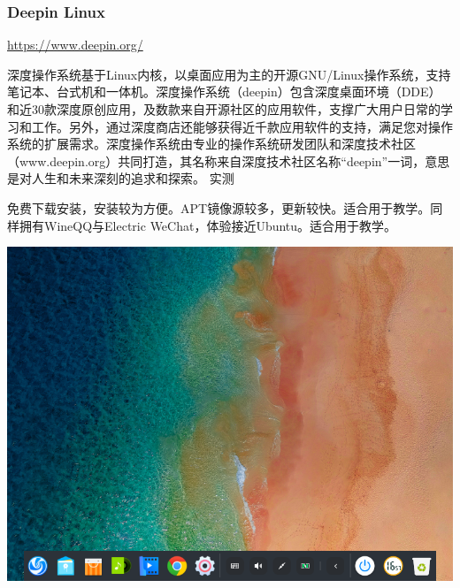 \documentclass{book}
\begin{document}
\subsubsection{Deepin Linux}
\url{https://www.deepin.org/}\par
\cite{deepininfo}深度操作系统基于Linux内核，以桌面应用为主的开源GNU/Linux操作系统，支持笔记本、台式机和一体机。深度操作系统（deepin）包含深度桌面环境（DDE）和近30款深度原创应用，及数款来自开源社区的应用软件，支撑广大用户日常的学习和工作。另外，通过深度商店还能够获得近千款应用软件的支持，满足您对操作系统的扩展需求。深度操作系统由专业的操作系统研发团队和深度技术社区（www.deepin.org）共同打造，其名称来自深度技术社区名称“deepin”一词，意思是对人生和未来深刻的追求和探索。
\large 实测\par
\normalsize 免费下载安装，安装较为方便。APT镜像源较多，更新较快。适合用于教学。同样拥有WineQQ与Electric WeChat，体验接近Ubuntu。适合用于教学。
\begin{center}
	\includegraphics[scale=0.5]{pic/deepin}
\end{center}
\end{document}

